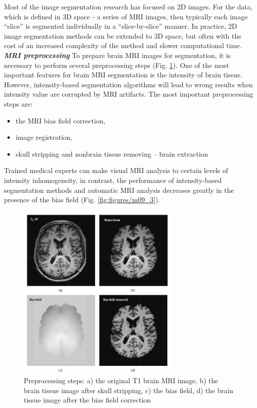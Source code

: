 Most of the image segmentation research has focused on 2D images. For the data, which is defined in 3D space - a series of MRI images, then typically each image “slice” is segmented individually in a “slice-by-slice” manner. In practice, 2D image segmentation methods can be extended to 3D space, but often with the cost of an increased complexity of the method and slower computational time.\\

\textbf{\textit{MRI preprocessing}}
To prepare brain MRI images for segmentation, it is necessary to perform several preprocessing steps (Fig. \ref{fig:figures/m09_2}). One of the most important features for brain MRI segmentation is the intensity of brain tissue. However, intensity-based segmentation algorithms will lead to wrong results when intensity value are corrupted by MRI artifacts. The most important preprocessing steps are:
\begin{itemize}
\item the MRI bias field correction,
\item image registration, 
\item skull stripping and nonbrain tissue removing – brain extraction
\end{itemize}

Trained medical experts can make visual MRI analysis to certain levels of intensity inhomogeneity, in contrast, the performance of intensity-based segmentation methods and automatic MRI analysis decreases greatly in the presence of the bias field (Fig. \ref{fig:figures/m09_3}).

\begin{figure}[H]
\centering{}\includegraphics[width=0.7\textwidth]{figures/Module_09/m09_2}\caption{Preprocessing steps: a) the original T1 brain MRI image, b) the brain tissue image after skull stripping, c)  the bias field, d) the brain tissue image after the bias field correction \label{fig:figures/m09_2}}
\end{figure}


